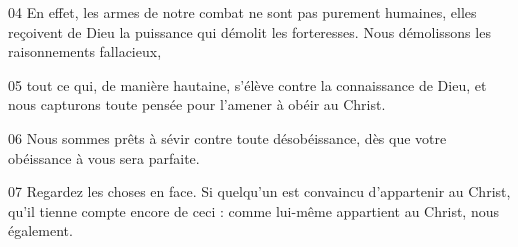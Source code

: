 
04 En effet, les armes de notre combat ne sont pas purement humaines, elles reçoivent de Dieu la puissance qui démolit les forteresses. Nous démolissons les raisonnements fallacieux,

05 tout ce qui, de manière hautaine, s’élève contre la connaissance de Dieu, et nous capturons toute pensée pour l’amener à obéir au Christ.

06 Nous sommes prêts à sévir contre toute désobéissance, dès que votre obéissance à vous sera parfaite.

07 Regardez les choses en face. Si quelqu’un est convaincu d’appartenir au Christ, qu’il tienne compte encore de ceci : comme lui-même appartient au Christ, nous également.
